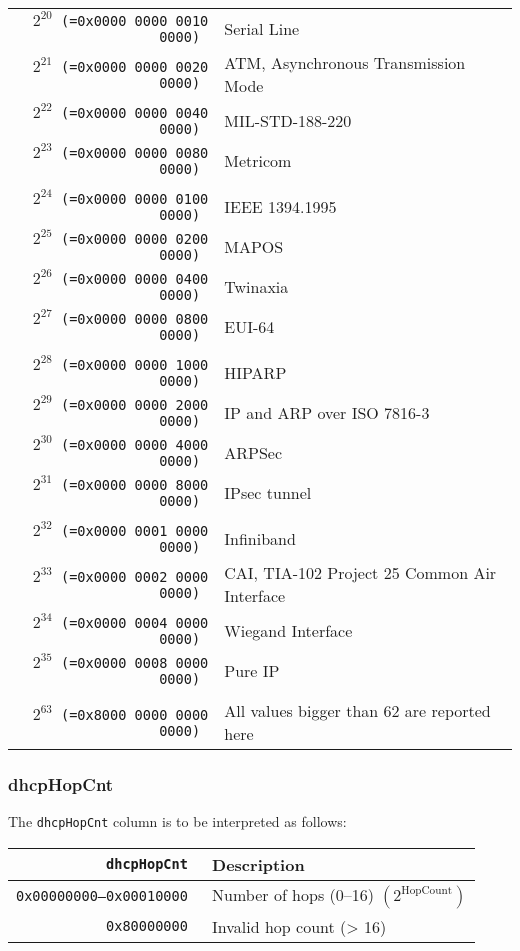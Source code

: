 \documentclass[documentation]{subfiles}
\begin{document}
\begin{longtable}{>{\tt}rl}
    \\
    $2^{20}$ (=0x0000 0000 0010 0000) & Serial Line \\
    $2^{21}$ (=0x0000 0000 0020 0000) & ATM, Asynchronous Transmission Mode \\
    $2^{22}$ (=0x0000 0000 0040 0000) & MIL-STD-188-220 \\
    $2^{23}$ (=0x0000 0000 0080 0000) & Metricom \\
    \\
    $2^{24}$ (=0x0000 0000 0100 0000) & IEEE 1394.1995 \\
    $2^{25}$ (=0x0000 0000 0200 0000) & MAPOS \\
    $2^{26}$ (=0x0000 0000 0400 0000) & Twinaxia \\
    $2^{27}$ (=0x0000 0000 0800 0000) & EUI-64 \\
    \\
    $2^{28}$ (=0x0000 0000 1000 0000) & HIPARP \\
    $2^{29}$ (=0x0000 0000 2000 0000) & IP and ARP over ISO 7816-3 \\
    $2^{30}$ (=0x0000 0000 4000 0000) & ARPSec \\
    $2^{31}$ (=0x0000 0000 8000 0000) & IPsec tunnel \\
    \\
    $2^{32}$ (=0x0000 0001 0000 0000) & Infiniband \\
    $2^{33}$ (=0x0000 0002 0000 0000) & CAI, TIA-102 Project 25 Common Air Interface \\
    $2^{34}$ (=0x0000 0004 0000 0000) & Wiegand Interface \\
    $2^{35}$ (=0x0000 0008 0000 0000) & Pure IP \\
    \\
    $2^{63}$ (=0x8000 0000 0000 0000) & All values bigger than 62 are reported here\\
    \bottomrule
\end{longtable}

\subsubsection{dhcpHopCnt}\label{dhcpHopCnt}
The {\tt dhcpHopCnt} column is to be interpreted as follows:
\begin{longtable}{>{\tt}rl}
    \toprule
    {\bf dhcpHopCnt} & {\bf Description}\\
    \midrule\endhead%
    0x00000000--0x00010000 & Number of hops (0--16) $\left(2^\text{HopCount}\right)$ \\
    0x80000000             & Invalid hop count (> 16)\\
    \bottomrule
\end{longtable}
\end{document}
